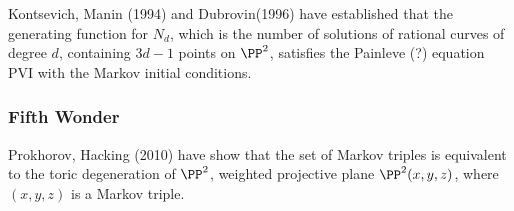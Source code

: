 \documentclass[11pt]{scrartcl}
\begin{document}
  Kontsevich, Manin (1994) and Dubrovin(1996) have established that
  the generating function for $N_{d}$, which is the number of
  solutions of rational curves of degree $d$, containing $3d-1$ points
  on $\PP^{2}$, satisfies the Painleve (?) equation PVI with the Markov initial conditions.

  \subsubsection{Fifth Wonder}

  Prokhorov, Hacking (2010) have show that the set of Markov triples
  is equivalent to the toric degeneration of $\PP^{2}$, weighted
  projective plane $\PP^{2}(x, y, z)$, where $(x, y, z)$ is a Markov
  triple.
\end{document}
